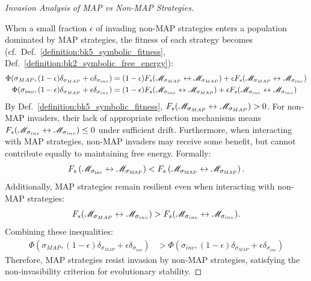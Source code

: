 \begin{proof}[Invasion Analysis of MAP vs Non-MAP Strategies]
\label{proof:bk5_map_invasion_dynamics}
\leavevmode

When a small fraction $\epsilon$ of invading non-MAP strategies enters a population dominated by MAP strategies, the fitness of each strategy becomes (cf.~Def.~\ref{definition:bk5_symbolic_fitness}, Def.~\ref{definition:bk2_symbolic_free_energy}):
\begin{align}
\Phi(\sigma_{MAP}, (1-\epsilon)\delta_{\sigma_{MAP}} + \epsilon\delta_{\sigma_{inv}}) &= (1-\epsilon)F_s(\mathscr{M}_{\sigma_{MAP}} \leftrightarrow \mathscr{M}_{\sigma_{MAP}}) + \epsilon F_s(\mathscr{M}_{\sigma_{MAP}} \leftrightarrow \mathscr{M}_{\sigma_{inv}}) \\
\Phi(\sigma_{inv}, (1-\epsilon)\delta_{\sigma_{MAP}} + \epsilon\delta_{\sigma_{inv}}) &= (1-\epsilon)F_s(\mathscr{M}_{\sigma_{inv}} \leftrightarrow \mathscr{M}_{\sigma_{MAP}}) + \epsilon F_s(\mathscr{M}_{\sigma_{inv}} \leftrightarrow \mathscr{M}_{\sigma_{inv}})
\end{align}
By Def.~\ref{definition:bk5_symbolic_fitness}, $F_s(\mathscr{M}_{\sigma_{MAP}} \leftrightarrow \mathscr{M}_{\sigma_{MAP}}) > 0$.
For non-MAP invaders, their lack of appropriate reflection mechanisms means $F_s(\mathscr{M}_{\sigma_{inv}} \leftrightarrow \mathscr{M}_{\sigma_{inv}}) \leq 0$ under sufficient drift.
Furthermore, when interacting with MAP strategies, non-MAP invaders may receive some benefit,
but cannot contribute equally to maintaining free energy. Formally:
\[
F_s\left(\mathscr{M}_{\sigma_{\text{inv}}} \leftrightarrow \mathscr{M}_{\sigma_{\text{MAP}}}\right) 
< 
F_s\left(\mathscr{M}_{\sigma_{\text{MAP}}} \leftrightarrow \mathscr{M}_{\sigma_{\text{MAP}}}\right).
\]
Additionally, MAP strategies remain resilient even when interacting with non-MAP strategies:
\[
F_s(\mathscr{M}_{\sigma_{MAP}} \leftrightarrow \mathscr{M}_{\sigma_{inv}})
>
F_s(\mathscr{M}_{\sigma_{inv}} \leftrightarrow \mathscr{M}_{\sigma_{inv}}).
\]
Combining these inequalities:
\begin{align}
\Phi(\sigma_{MAP}, (1-\epsilon)\delta_{\sigma_{MAP}} + \epsilon\delta_{\sigma_{inv}}) &> \Phi(\sigma_{inv}, (1-\epsilon)\delta_{\sigma_{MAP}} + \epsilon\delta_{\sigma_{inv}})
\end{align}
Therefore, MAP strategies resist invasion by non-MAP strategies, satisfying the non-invasibility criterion for evolutionary stability.
\end{proof}
